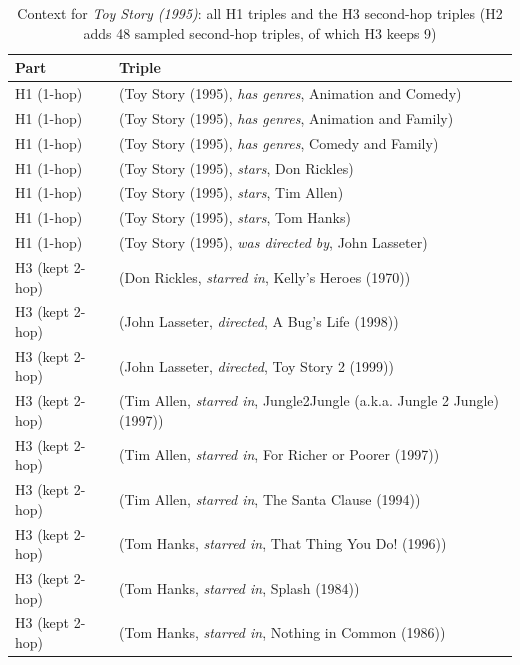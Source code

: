\begin{table}[H]
\centering
\small
\begin{tabular}{lp{11cm}}
\toprule
Part & Triple \\
\midrule
H1 (1-hop) & (Toy Story (1995), \textit{has genres}, Animation and Comedy) \\
H1 (1-hop) & (Toy Story (1995), \textit{has genres}, Animation and Family) \\
H1 (1-hop) & (Toy Story (1995), \textit{has genres}, Comedy and Family) \\
H1 (1-hop) & (Toy Story (1995), \textit{stars}, Don Rickles) \\
H1 (1-hop) & (Toy Story (1995), \textit{stars}, Tim Allen) \\
H1 (1-hop) & (Toy Story (1995), \textit{stars}, Tom Hanks) \\
H1 (1-hop) & (Toy Story (1995), \textit{was directed by}, John Lasseter) \\
H3 (kept 2-hop) & (Don Rickles, \textit{starred in}, Kelly's Heroes (1970)) \\
H3 (kept 2-hop) & (John Lasseter, \textit{directed}, A Bug's Life (1998)) \\
H3 (kept 2-hop) & (John Lasseter, \textit{directed}, Toy Story 2 (1999)) \\
H3 (kept 2-hop) & (Tim Allen, \textit{starred in}, Jungle2Jungle (a.k.a. Jungle 2 Jungle) (1997)) \\
H3 (kept 2-hop) & (Tim Allen, \textit{starred in}, For Richer or Poorer (1997)) \\
H3 (kept 2-hop) & (Tim Allen, \textit{starred in}, The Santa Clause (1994)) \\
H3 (kept 2-hop) & (Tom Hanks, \textit{starred in}, That Thing You Do! (1996)) \\
H3 (kept 2-hop) & (Tom Hanks, \textit{starred in}, Splash (1984)) \\
H3 (kept 2-hop) & (Tom Hanks, \textit{starred in}, Nothing in Common (1986)) \\
\bottomrule
\end{tabular}
\caption{Context for \textit{Toy Story (1995)}: all H1 triples and the H3 second-hop triples (H2 adds 48 sampled second-hop triples, of which H3 keeps 9)}
\label{tab:example_context}
\end{table}

